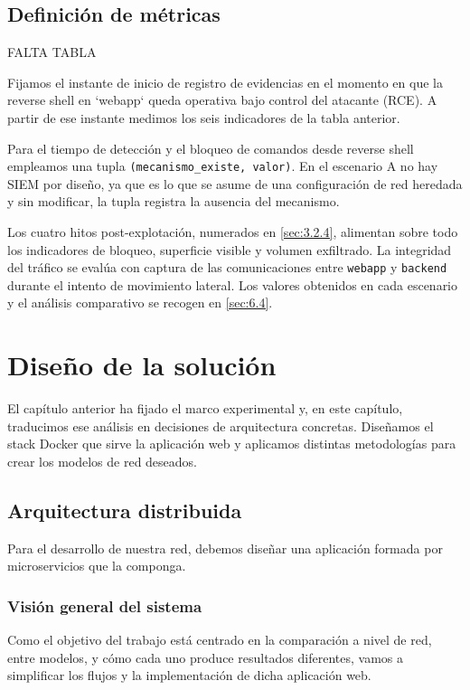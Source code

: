 \documentclass[11pt,spanish,listoffigures,listoftables]{tfgetsinf}
\begin{document}
    \section{Definición de métricas}
    \label{sec:3.4}
    FALTA TABLA
    
    Fijamos el instante de inicio de registro de evidencias en el momento en que la reverse shell en `webapp` queda operativa bajo control del atacante (RCE). A partir de ese instante medimos los seis indicadores de la tabla anterior.

    Para el tiempo de detección y el bloqueo de comandos desde reverse shell empleamos una tupla \texttt{(mecanismo\_existe, valor)}. En el escenario A no hay SIEM por diseño, ya que es lo que se asume de una configuración de red heredada y sin modificar, la tupla registra la ausencia del mecanismo.
    
    Los cuatro hitos post-explotación, numerados en \cref{sec:3.2.4}, alimentan sobre todo los indicadores de bloqueo, superficie visible y volumen exfiltrado. La integridad del tráfico se evalúa con captura de las comunicaciones entre \texttt{webapp} y \texttt{backend} durante el intento de movimiento lateral. Los valores obtenidos en cada escenario y el análisis comparativo se recogen en \cref{sec:6.4}.
    

\chapter{Diseño de la solución}
\label{sec:4}
El capítulo anterior ha fijado el marco experimental y, en este capítulo, traducimos ese análisis en decisiones de arquitectura concretas. Diseñamos el stack Docker que sirve la aplicación web y aplicamos distintas metodologías para crear los modelos de red deseados.

    \section{Arquitectura distribuida}
    Para el desarrollo de nuestra red, debemos diseñar una aplicación formada por microservicios que la componga.

        \subsection{Visión general del sistema}
        Como el objetivo del trabajo está centrado en la comparación a nivel de red, entre modelos, y cómo cada uno produce resultados diferentes, vamos a simplificar los flujos y la implementación de dicha aplicación web.
\end{document}
